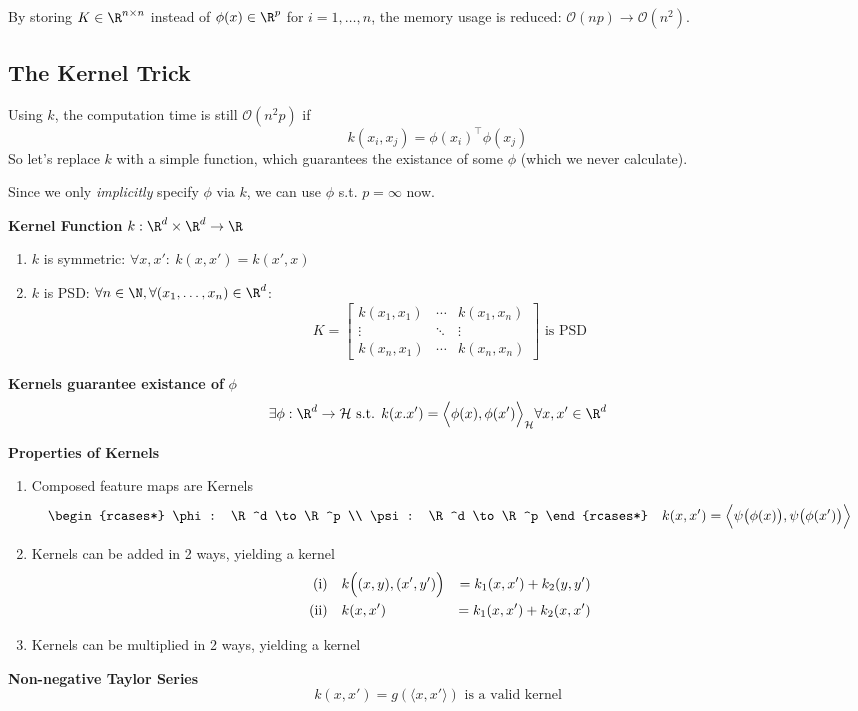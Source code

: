 By storing $K \in \R^{n\times n}$ instead of $\phi(x) \in \R^p$ for $i=1,\ldots,n$, the memory usage is reduced: $\mathcal{O}(np) \to \mathcal{O}(n^2)$.

\newpage
\subsection{The Kernel Trick}

Using $k$, the computation time is still $\mathcal{O}(n^2p)$ if 
$$
    k(x_i,x_j) = \phi(x_i)^\top \phi(x_j)
$$
So let's replace $k$ with a simple function, which guarantees the existance of some $\phi$ (which we never calculate).

{\scriptsize
    \remark Since we only \textit{implicitly} specify $\phi$ via $k$, we can use $\phi$ s.t. $p=\infty$ now.
}

 \textbf{Kernel Function} $k: \R^d \times \R^d \to \R$
\begin{enumerate}
    \item $k$ is symmetric: $\forall x,x':\ k(x,x') = k(x',x)$
    \item $k$ is PSD: $\forall n \in \N, \forall (x_1,\ldots,x_n) \in \R^d$:
    $$
        K = \begin{bmatrix}
            k(x_1,x_1)  & \cdots    & k(x_1,x_n)    \\
            \vdots      & \ddots    & \vdots        \\
            k(x_n,x_1)  & \cdots    & k(x_n,x_n)
        \end{bmatrix} \text{ is PSD}
    $$
\end{enumerate}

\theorem \textbf{Kernels guarantee existance of} $\phi$\\
$$
    \exists\phi:\R^d\to\mathcal{H} \text{ s.t. } k(x.x') = \Bigl\langle \phi(x),\phi(x') \Bigr\rangle_\mathcal{H} \forall x,x' \in \R^d
$$

\lemma \textbf{Properties of Kernels}
\begin{enumerate}
    \item Composed feature maps are Kernels
    $$
        \begin{rcases*}
            \phi: \R^d \to \R^p \\
            \psi: \R^d \to \R^p
        \end{rcases*}
        \quad k(x,x') = \Bigl\langle \psi\bigl( \phi(x) \bigr), \psi\bigl( \phi(x') \bigr) \Bigr\rangle
    $$
    \item Kernels can be added in 2 ways, yielding a kernel
    \begin{align*}
        \text{(i)}\quad     & k\Bigl( (x,y),(x',y') \Bigr)    &= k_1(x,x') + k_2(y,y') \\
        \text{(ii)}\quad    & k(x,x')                         &= k_1(x,x') + k_2(x,x')  
    \end{align*}
    \item Kernels can be multiplied in 2 ways, yielding a kernel
\end{enumerate}

\lemma \textbf{Non-negative Taylor Series}\\
$$
    k(x,x') = g(\langle x,x' \rangle) \text{ is a valid kernel}
$$

